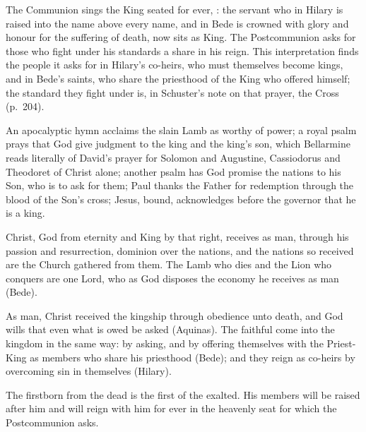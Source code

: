 The Communion sings the King seated for ever, : the servant who in Hilary is raised into the name above every
name, and in Bede is crowned with glory and honour for the suffering of death,
now sits as King. The Postcommunion asks for those who fight under his
standards a share in his reign. This interpretation finds the people it asks
for in Hilary's co-heirs, who must themselves become kings, and in Bede's
saints, who share the priesthood of the King who offered himself; the standard
they fight under is, in Schuster's note on that prayer, the Cross (p.~204).

\begin{fourSenses}
\item[Literal.] An apocalyptic hymn acclaims the slain Lamb as worthy of power;
a royal psalm prays that God give judgment to the king and the king's son,
which Bellarmine reads literally of David's prayer for Solomon and Augustine,
Cassiodorus and Theodoret of Christ alone; another psalm has God promise the
nations to his Son, who is to ask for them; Paul thanks the Father for
redemption through the blood of the Son's cross; Jesus, bound, acknowledges
before the governor that he is a king.
\item[Allegorical.] Christ, God from eternity and King by that right, receives
as man, through his passion and resurrection, dominion over the nations, and
the nations so received are the Church gathered from them. The Lamb who dies
and the Lion who conquers are one Lord, who as God disposes the economy he
receives as man (Bede).
\item[Moral.] As man, Christ received the kingship through obedience unto death, and
God wills that even what is owed be asked (Aquinas). The faithful come into the
kingdom in the same way: by asking, and by offering themselves with the
Priest-King as members who share his priesthood (Bede); and they reign as
co-heirs by overcoming sin in themselves (Hilary).
\item[Anagogical.] The firstborn from the dead is the first of the exalted.
His members will be raised after him and will reign with him for ever in the
heavenly seat for which the Postcommunion asks.
\end{fourSenses}
